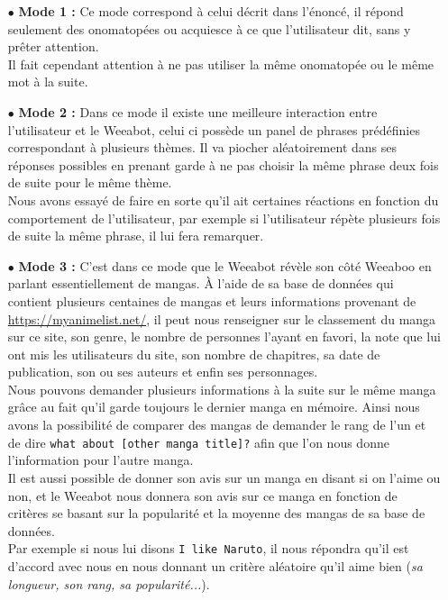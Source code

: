 \documentclass[paper=a4, fontsize=11pt]{article}
\begin{document}
\begin{itemize}
\item[$\bullet$] \textbf{Mode 1 :} Ce mode correspond à celui décrit dans l'énoncé, il répond seulement des onomatopées ou acquiesce à ce que l'utilisateur dit, sans y prêter attention.\\ Il fait cependant attention à ne pas utiliser la même onomatopée ou le même mot à la suite.\\
\item[$\bullet$] \textbf{Mode 2 :} Dans ce mode il existe une meilleure interaction entre l'utilisateur et le Weeabot, celui ci possède un panel de phrases prédéfinies correspondant à plusieurs thèmes. Il va piocher aléatoirement dans ses réponses possibles en prenant garde à ne pas choisir la même phrase deux fois de suite pour le même thème. \\
Nous avons essayé de faire en sorte qu'il ait certaines réactions en fonction du comportement de l'utilisateur, par exemple si l'utilisateur répète plusieurs fois de suite la même phrase, il lui fera remarquer.\\
\item[$\bullet$] \textbf{Mode 3 :} C'est dans ce mode que le Weeabot révèle son côté Weeaboo en parlant essentiellement de mangas. À l'aide de sa base de données qui contient plusieurs centaines de mangas et leurs informations provenant de \url{https://myanimelist.net/}, il peut nous renseigner sur le classement du manga sur ce site, son genre, le nombre de personnes l'ayant en favori, la note que lui ont mis les utilisateurs du site, son nombre de chapitres, sa date de publication, son ou ses auteurs et enfin ses personnages. \\
Nous pouvons demander plusieurs informations à la suite sur le même manga grâce au fait qu'il garde toujours le dernier manga en mémoire. Ainsi nous avons la possibilité de comparer des mangas de demander le rang de l'un et de dire \texttt{what about [other manga title]?} afin que l'on nous donne l'information pour l'autre manga. \\
Il est aussi possible de donner son avis sur un manga en disant si on l'aime ou non, et le Weeabot nous donnera son avis sur ce manga en fonction de critères se basant sur la popularité et la moyenne des mangas de sa base de données. \\
Par exemple si nous lui disons \texttt{I like Naruto}, il nous répondra qu'il est d'accord avec nous en nous donnant un critère aléatoire qu'il aime bien (\textit{sa longueur, son rang, sa popularité...}).\\

\end{itemize}
\end{document}
